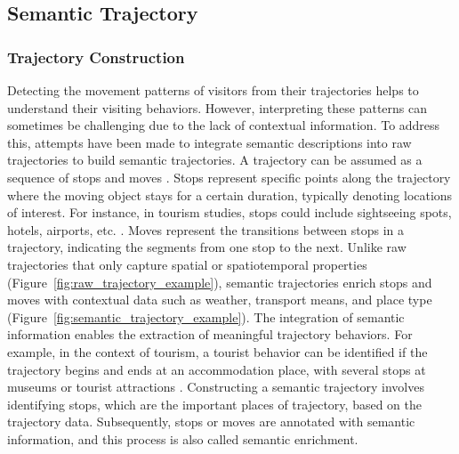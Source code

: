 \documentclass{article}
\theoremstyle{definition}
\theoremstyle{remark}
\begin{document}
\subsection{Semantic Trajectory} \label{semantic_trajectory}

\subsubsection{Trajectory Construction}
Detecting the movement patterns of visitors from their trajectories helps to understand their visiting behaviors. However, interpreting these patterns can sometimes be challenging due to the lack of contextual information. To address this, attempts have been made to integrate semantic descriptions into raw trajectories to build semantic trajectories. A trajectory can be assumed as a sequence of stops and moves \citep{spaccapietra_conceptual_2008}. Stops represent specific points along the trajectory where the moving object stays for a certain duration, typically denoting locations of interest. For instance, in tourism studies, stops could include sightseeing spots, hotels, airports, etc. \citep{yuan_review_2017}. Moves represent the transitions between stops in a trajectory, indicating the segments from one stop to the next. Unlike raw trajectories that only capture spatial or spatiotemporal properties (Figure~\ref{fig:raw_trajectory_example}), semantic trajectories enrich stops and moves with contextual data such as weather, transport means, and place type (Figure~\ref{fig:semantic_trajectory_example}). The integration of semantic information enables the extraction of meaningful trajectory behaviors. For example, in the context of tourism, a tourist behavior can be identified if the trajectory begins and ends at an accommodation place, with several stops at museums or tourist attractions \citep{parent_semantic_2013}. Constructing a semantic trajectory involves identifying stops, which are the important places of trajectory, based on the trajectory data. Subsequently, stops or moves are annotated with semantic information, and this process is also called semantic enrichment.
\end{document}
